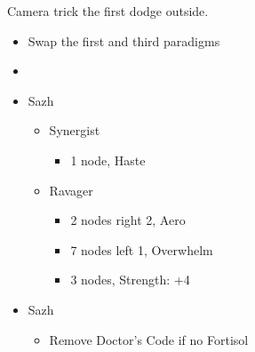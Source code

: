 \renewcommand{\first}{[1] Tide Turner (\syn/\sab)}
\renewcommand{\second}{[2] War and Peace (\com/\med)}
\renewcommand{\third}{[3] Slash \& Burn (\com/\rav)}
\renewcommand{\fourth}{[4] Dualcasting (\rav/\rav)}
\renewcommand{\fifth}{[5] Undermine (\rav/\sab)}
\renewcommand{\sixth}{[6] Divide \& Conquer (\com/\sab)}

Camera trick the first dodge outside.
\newpage
\begin{multicols}{2}
  \begin{menu}
    \begin{itemize}
      \paradigm
      \begin{itemize}
        \item Swap the first and third paradigms
        \item {}%
              {\paradigmline[1]{\textit{\syn}}{\textit{\sab}}{}}%
              {\paradigmline{\com}{\med}{}}%
              {\paradigmline{\com}{\rav}{}}%
              {\paradigmline{\rav}{\rav}{}}%
              {\paradigmline{[\rav]}{(\sab)}{}}%
              {\paradigmline{[\com]}{(\sab)}{}}
      \end{itemize}
      \crystarium
      \begin{itemize}
        \item Sazh
              \begin{itemize}
                \item Synergist
                      \begin{itemize}
                        \item 1 node, Haste
                      \end{itemize}
                \item Ravager
                      \begin{itemize}
                        \item 2 nodes right 2, Aero
                        \item 7 nodes left 1, Overwhelm
                        \item 3 nodes, Strength: +4
                      \end{itemize}
              \end{itemize}
      \end{itemize}
      \equip
      \begin{itemize}
        \item Sazh
              \begin{itemize}
                \item Remove Doctor's Code if no Fortisol
              \end{itemize}
      \end{itemize}
    \end{itemize}
  \end{menu}


\end{multicols}
